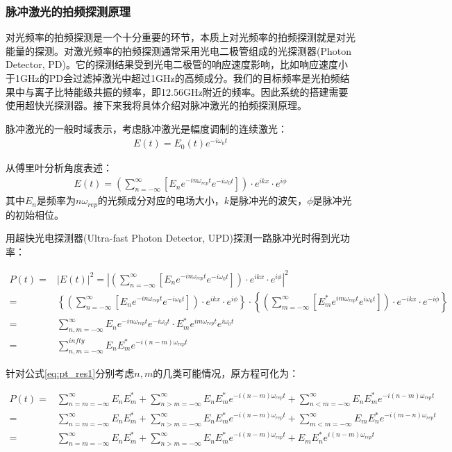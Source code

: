 \subsubsection[脉冲激光的拍频探测原理]{脉冲激光的拍频探测原理}
对光频率的拍频探测是一个十分重要的环节，本质上对光频率的拍频探测就是对光能量的探测。对激光频率的拍频探测通常采用光电二极管组成的光探测器(Photon Detector, PD)。它的探测结果受到光电二极管的响应速度影响，比如响应速度小于1GHz的PD会过滤掉激光中超过1GHz的高频成分。我们的目标频率是光拍频结果中与离子比特能级共振的频率，即12.56GHz附近的频率。因此系统的搭建需要使用超快光探测器。接下来我将具体介绍对脉冲激光的拍频探测原理。

脉冲激光的一般时域表示，考虑脉冲激光是幅度调制的连续激光：
\begin{align}
    E(t)=E_0 (t) e^{-i\omega_0 t}
\end{align}

从傅里叶分析角度表述：
\begin{align}
    E(t)=\left(\sum_{n=-\infty}^{\infty}\left[E_n e^{-in\omega_{rep}t} e^{-i\omega_0 t} \right]\right)\cdot e^{ikx}\cdot e^{i\phi}
\end{align}
其中$E_n$是频率为$n\omega_{rep}$的光频成分对应的电场大小，$k$是脉冲光的波矢，$\phi$是脉冲光的初始相位。

用超快光电探测器(Ultra-fast Photon Detector, UPD)探测一路脉冲光时得到光功率：
\begin{footnotesize}
\begin{align}
    P(t)=&|E(t)|^2=\left|\left(\sum_{n=-\infty}^{\infty}\left[E_n e^{-in\omega_{rep}t} e^{-i\omega_0 t} \right]\right)\cdot e^{ikx}\cdot e^{i\phi}\right|^2\\
    =&\left\{\left(\sum_{n=-\infty}^{\infty}\left[E_n e^{-in\omega_{rep}t} e^{-iω_0 t} \right]\right)\cdot e^{ikx}\cdot e^{i\phi}\right\} \cdot\left\{\left(\sum_{m=-\infty}^{\infty}\left[E^*_m e^{im\omega_{rep}t} e^{i\omega_0 t} \right]\right)\cdot e^{-ikx}\cdot e^{-i\phi}\right\}\\
    =&\sum_{n,m=-\infty}^{\infty}E_n e^{-in\omega_{rep} t} e^{-i\omega_0 t}\cdot E_m^* e^{im\omega_{rep} t} e^{i\omega_0 t}\\
    =&\sum_{n,m=-\infty}^{infty}E_n E_m^* e^{-i(n-m) \omega_{rep} t}\label{eq:pt_res1}
\end{align}    
\end{footnotesize}

针对公式\eqref{eq:pt_res1}分别考虑$n,m$的几类可能情况，原方程可化为：
\begin{footnotesize}
\begin{align}
    P(t)=&\sum_{n=m=-\infty}^{\infty}E_n E_m^*
    +\sum_{n>m=-\infty}^{\infty}E_n E_m^*e^{-i(n-m)\omega_{rep}t}+\sum_{n<m=-\infty}^{\infty}E_n E_m^*e^{-i(n-m)\omega_{rep}t}\\
    =&\sum_{n=m=-\infty}^{\infty}E_n E_m^*
    +\sum_{n>m=-\infty}^{\infty}E_n E_m^*e^{-i(n-m)\omega_{rep}t}+\sum_{m<m=-\infty}^{\infty}E_m E_n^*e^{-i(m-n)\omega_{rep}t}\\
    =&\sum_{n=m=-\infty}^{\infty}E_n E_m^*+\sum_{n>m=-\infty}^{\infty}E_n E_m^*e^{-i(n-m)\omega_{rep}t}+E_mE_n^* e^{i(n-m)\omega_{rep}t}
\end{align}
\end{footnotesize}

